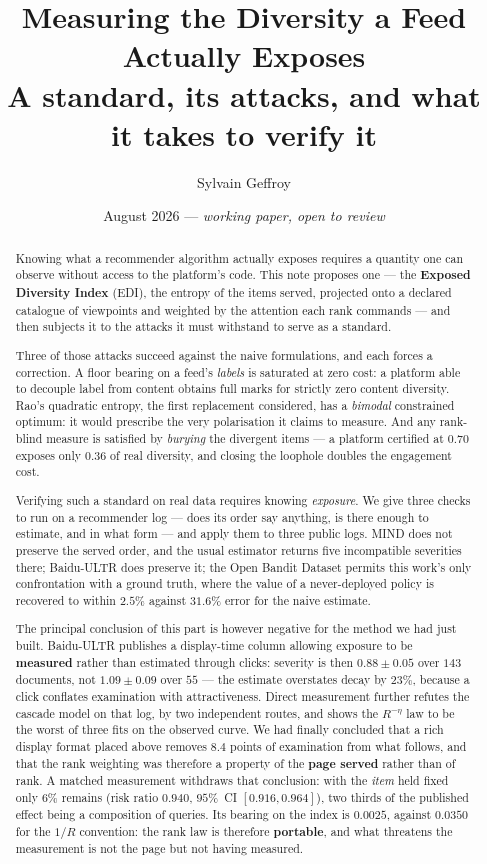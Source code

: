 \documentclass[11pt,a4paper]{article}
\title{\textbf{Measuring the Diversity a Feed Actually Exposes}\\[2mm]
       \large A standard, its attacks, and what it takes to verify it}
\author{Sylvain Geffroy}
\date{August 2026 --- \emph{working paper, open to review}}
\begin{document}
\maketitle

\begin{abstract}
\noindent
Knowing what a recommender algorithm actually exposes requires a quantity one can observe
without access to the platform's code. This note proposes one --- the \textbf{Exposed
Diversity Index} (EDI), the entropy of the items served, projected onto a declared catalogue
of viewpoints and weighted by the attention each rank commands --- and then subjects it to the
attacks it must withstand to serve as a standard.

Three of those attacks succeed against the naive formulations, and each forces a correction. A
floor bearing on a feed's \emph{labels} is saturated at zero cost: a platform able to decouple
label from content obtains full marks for strictly zero content diversity. Rao's quadratic
entropy, the first replacement considered, has a \emph{bimodal} constrained optimum: it would
prescribe the very polarisation it claims to measure. And any rank-blind measure is satisfied
by \emph{burying} the divergent items --- a platform certified at $0.70$ exposes only $0.36$ of
real diversity, and closing the loophole doubles the engagement cost.

Verifying such a standard on real data requires knowing \emph{exposure}. We give three checks to
run on a recommender log --- does its order say anything, is there enough to estimate, and in what
form --- and apply them to three public logs. MIND does not preserve the served order, and the
usual estimator returns five incompatible severities there; Baidu-ULTR does preserve it; the Open
Bandit Dataset permits this work's only confrontation with a ground truth, where the value of a
never-deployed policy is recovered to within $2.5\%$ against $31.6\%$ error for the naive estimate.

The principal conclusion of this part is however negative for the method we had just built.
Baidu-ULTR publishes a display-time column allowing exposure to be \textbf{measured} rather than
estimated through clicks: severity is then $0.88 \pm 0.05$ over $143$ documents, not
$1.09 \pm 0.09$ over $55$ --- the estimate overstates decay by $23\%$, because a click conflates
examination with attractiveness. Direct measurement further refutes the cascade model on that log,
by two independent routes, and shows the $R^{-\eta}$ law to be the worst of three fits on the
observed curve. We had finally concluded that a rich display format placed above removes $8.4$
points of examination from what follows, and that the rank weighting was therefore a property of
the \textbf{page served} rather than of rank. A matched measurement withdraws that conclusion:
with the \emph{item} held fixed only $6\%$ remains (risk ratio $0.940$, $95\%$~CI
$[0.916, 0.964]$), two thirds of the published effect being a composition of queries. Its bearing
on the index is $0.0025$, against $0.0350$ for the $1/R$ convention: the rank law is therefore
\textbf{portable}, and what threatens the measurement is not the page but not having measured.


\end{abstract}
\end{document}
